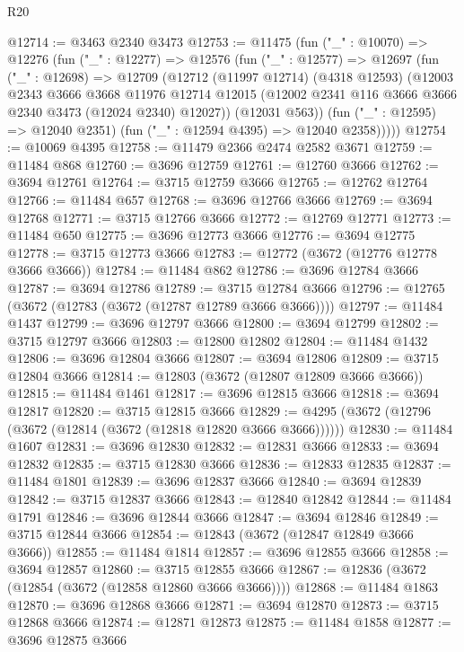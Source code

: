 \begin{lexlean}{R20}
\begin{coremodule}
@12714 := @3463 @2340 @3473
@12753 := @11475
    (fun ("_" : @10070) =>
    @12276
      (fun ("_" : @12277) =>
      @12576
        (fun ("_" : @12577) =>
        @12697
          (fun ("_" : @12698) =>
          @12709
            (@12712
              (@11997 @12714)
              (@4318 @12593)
              (@12003
                @2343
                @3666
                @3668
                @11976
                @12714
                @12015
                (@12002 @2341 @116 @3666 @3666 @2340 @3473 (@12024 @2340) @12027))
              (@12031 @563))
            (fun ("_" : @12595) => @12040 @2351)
            (fun ("_" : @12594 @4395) => @12040 @2358)))))
@12754 := @10069 @4395
@12758 := @11479 @2366 @2474 @2582 @3671
@12759 := @11484 @868
@12760 := @3696 @12759
@12761 := @12760 @3666
@12762 := @3694 @12761
@12764 := @3715 @12759 @3666
@12765 := @12762 @12764
@12766 := @11484 @657
@12768 := @3696 @12766 @3666
@12769 := @3694 @12768
@12771 := @3715 @12766 @3666
@12772 := @12769 @12771
@12773 := @11484 @650
@12775 := @3696 @12773 @3666
@12776 := @3694 @12775
@12778 := @3715 @12773 @3666
@12783 := @12772 (@3672 (@12776 @12778 @3666 @3666))
@12784 := @11484 @862
@12786 := @3696 @12784 @3666
@12787 := @3694 @12786
@12789 := @3715 @12784 @3666
@12796 := @12765 (@3672 (@12783 (@3672 (@12787 @12789 @3666 @3666))))
@12797 := @11484 @1437
@12799 := @3696 @12797 @3666
@12800 := @3694 @12799
@12802 := @3715 @12797 @3666
@12803 := @12800 @12802
@12804 := @11484 @1432
@12806 := @3696 @12804 @3666
@12807 := @3694 @12806
@12809 := @3715 @12804 @3666
@12814 := @12803 (@3672 (@12807 @12809 @3666 @3666))
@12815 := @11484 @1461
@12817 := @3696 @12815 @3666
@12818 := @3694 @12817
@12820 := @3715 @12815 @3666
@12829 := @4295 (@3672 (@12796 (@3672 (@12814 (@3672 (@12818 @12820 @3666 @3666))))))
@12830 := @11484 @1607
@12831 := @3696 @12830
@12832 := @12831 @3666
@12833 := @3694 @12832
@12835 := @3715 @12830 @3666
@12836 := @12833 @12835
@12837 := @11484 @1801
@12839 := @3696 @12837 @3666
@12840 := @3694 @12839
@12842 := @3715 @12837 @3666
@12843 := @12840 @12842
@12844 := @11484 @1791
@12846 := @3696 @12844 @3666
@12847 := @3694 @12846
@12849 := @3715 @12844 @3666
@12854 := @12843 (@3672 (@12847 @12849 @3666 @3666))
@12855 := @11484 @1814
@12857 := @3696 @12855 @3666
@12858 := @3694 @12857
@12860 := @3715 @12855 @3666
@12867 := @12836 (@3672 (@12854 (@3672 (@12858 @12860 @3666 @3666))))
@12868 := @11484 @1863
@12870 := @3696 @12868 @3666
@12871 := @3694 @12870
@12873 := @3715 @12868 @3666
@12874 := @12871 @12873
@12875 := @11484 @1858
@12877 := @3696 @12875 @3666

\end{coremodule}
\end{lexlean}
